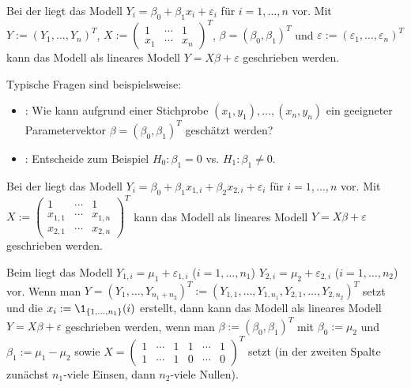\begin{Bsp}
    Bei der 
    liegt das Modell $Y_i = \beta_0 + \beta_1 x_i + \varepsilon_i$ für $i = 1, \dotsc, n$ vor.
    Mit $Y := (Y_1, \dotsc, Y_n)^T$,
    $X := \begin{pmatrix}1 & \cdots & 1\\x_1 & \cdots & x_n\end{pmatrix}^T$,
    $\beta = (\beta_0, \beta_1)^T$ und
    $\varepsilon := (\varepsilon_1, \dotsc, \varepsilon_n)^T$
    kann das Modell als lineares Modell $Y = X\beta + \varepsilon$ geschrieben werden.

    Typische Fragen sind beispielsweise:
    \begin{itemize}
        \item
        : Wie kann aufgrund einer Stichprobe
        $(x_1, y_1), \dotsc, (x_n, y_n)$ ein geeigneter Parametervektor
        $\beta = (\beta_0, \beta_1)^T$ geschätzt werden?

        \item
        : Entscheide zum Beispiel
        $H_0\colon \beta_1 = 0$ vs. $H_1\colon \beta_1 \not= 0$.
    \end{itemize}
\end{Bsp}

\linie

\begin{Bsp}
    Bei der  liegt das Modell
    $Y_i = \beta_0 + \beta_1 x_{1,i} + \beta_2 x_{2,i} + \varepsilon_i$
    für $i = 1, \dotsc, n$ vor.
    Mit $X := \begin{pmatrix}1 & \cdots & 1\\x_{1,1} & \cdots & x_{1,n}\\x_{2,1} & \cdots & x_{2,n}
    \end{pmatrix}^T$
    kann das Modell als lineares Modell $Y = X\beta + \varepsilon$ geschrieben werden.
\end{Bsp}

\linie

\begin{Bsp}
    Beim  liegt das Modell
    $Y_{1,i} = \mu_1 + \varepsilon_{1,i}$ ($i = 1, \dotsc, n_1$)
    $Y_{2,i} = \mu_2 + \varepsilon_{2,i}$ ($i = 1, \dotsc, n_2$) vor.
    Wenn man $Y = (Y_1, \dotsc, Y_{n_1+n_2})^T := (Y_{1,1}, \dotsc, Y_{1,n_1},
    Y_{2,1}, \dotsc, Y_{2,n_2})^T$ setzt und die 
    $x_i := \1_{\{1, \dotsc, n_1\}}(i)$ erstellt, dann
    kann das Modell als lineares Modell $Y = X\beta + \varepsilon$ geschrieben werden,
    wenn man $\beta := (\beta_0, \beta_1)^T$ mit $\beta_0 := \mu_2$ und $\beta_1 := \mu_1 - \mu_2$
    sowie $X = \begin{pmatrix}1 & \cdots & 1 & 1 & \cdots & 1\\1 & \cdots & 1 & 0 & \cdots & 0
    \end{pmatrix}^T$ setzt
    (in der zweiten Spalte zunächst $n_1$-viele Einsen, dann $n_2$-viele Nullen).
\end{Bsp}

